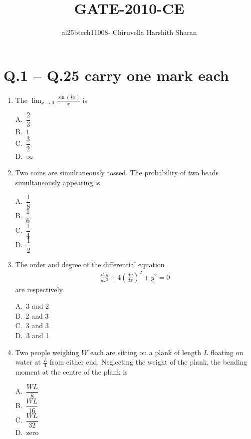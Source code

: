 \documentclass[journal,12pt,onecolumn]{IEEEtran}
\title{\huge {GATE-2010-CE}}
\author{ai25btech11008- Chiruvella Harshith Sharan}
\date{}
\theoremstyle{remark}
\begin{document}
\maketitle

\setlength{\parindent}{0pt}
\setlength{\parskip}{0.5cm}

\section*{Q.1 -- Q.25 carry one mark each}

\begin{enumerate}
\item The $\displaystyle \lim_{x \to 0} \frac{\sin \left( \frac{2}{3} x \right)}{x}$ is  
\hfill{}
\begin{multicols}{4}
A.\ $\dfrac{2}{3}$ \\
B.\ $1$ \\
C.\ $\dfrac{3}{2}$ \\
D.\ $\infty$
\end{multicols}
\noindent\item Two coins are simultaneously tossed. The probability of two heads simultaneously appearing is \hfill{}
\begin{multicols}{4}
A.\ $\dfrac{1}{8}$ \\
B.\ $\dfrac{1}{6}$ \\
C.\ $\dfrac{1}{4}$ \\
D.\ $\dfrac{1}{2}$
\end{multicols}

\noindent\item The order and degree of the differential equation 
\begin{align*}
\frac{d^3 y}{dx^3} + 4 \left( \frac{dy}{dx} \right)^2 + y^2 = 0
\end{align*}
are respectively \hfill{}
\begin{multicols}{4}
A.\ 3 and 2 \\
B.\ 2 and 3 \\
C.\ 3 and 3 \\
D.\ 3 and 1
\end{multicols}

\noindent\item Two people weighing $W$ each are sitting on a plank of length $L$ floating on water at $\frac{L}{4}$ from either end. Neglecting the weight of the plank, the bending moment at the centre of the plank is \hfill{}
\begin{multicols}{4}
A.\ $\dfrac{WL}{8}$ \\
B.\ $\dfrac{WL}{16}$ \\
C.\ $\dfrac{WL}{32}$ \\
D.\ zero
\end{multicols}


\end{enumerate}
\end{document}
